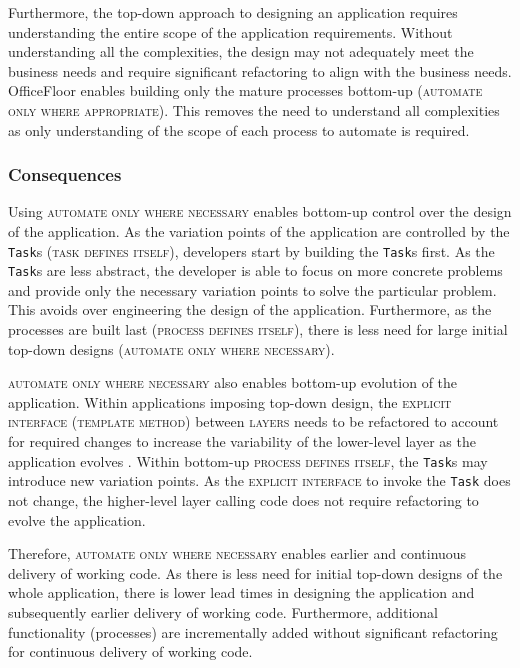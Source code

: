 \documentclass[prodmode]{style/acmlarge}
\begin{document}
Furthermore, the top-down approach to designing an application requires
understanding the entire scope of the application requirements.  Without
understanding all the complexities, the design may not adequately meet the
business needs and require significant refactoring to align with the business
needs.  OfficeFloor enables building only the mature processes bottom-up
(\textsc{automate only where appropriate}).  This removes the need to understand
all complexities as only understanding of the scope of each process to automate
is required.


\subsubsection*{Consequences}

Using \textsc{automate only where necessary} enables bottom-up control over the
design of the application.  As the variation points of the application are
controlled by the \texttt{Task}s (\textsc{task defines itself}), developers
start by building the \texttt{Task}s first.  As the \texttt{Task}s are less
abstract, the developer is able to focus on more concrete problems and provide
only the necessary variation points to solve the particular problem.  This
avoids over engineering the design of the application.  Furthermore, as the
processes are built last (\textsc{process defines itself}), there is less need
for large initial top-down designs (\textsc{automate only where necessary}).

\textsc{automate only where necessary} also enables bottom-up evolution of the
application.  Within applications imposing top-down design, the
\textsc{explicit interface} (\textsc{template method}) between \textsc{layers}
needs to be refactored to account for required changes to increase the
variability of the lower-level layer as the application evolves \cite{ioc}.
Within bottom-up \textsc{process defines itself}, the \texttt{Task}s may
introduce new variation points.  As the \textsc{explicit interface} to invoke
the \texttt{Task} does not change, the higher-level layer calling code does not
require refactoring to evolve the application.

Therefore, \textsc{automate only where necessary} enables earlier and continuous
delivery of working code.  As there is less need for initial top-down designs of
the whole application, there is lower lead times in designing the application
and subsequently earlier delivery of working code.  Furthermore, additional
functionality (processes) are incrementally added without significant
refactoring for continuous delivery of working code.
\end{document}
